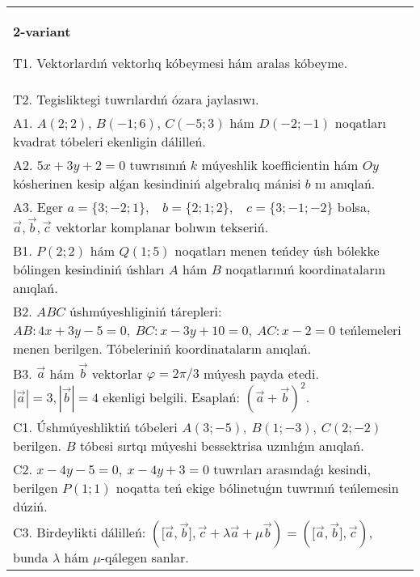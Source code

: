 \documentclass{article}
\begin{document}
\begin{tabular}{m{17cm}}
\textbf{2-variant}
\newline

T1. 
Vektorlardıń vektorlıq kóbeymesi hám aralas kóbeyme.
 \\
T2. 
Tegisliktegi tuwrılardıń ózara jaylasıwı.
 \\
A1. 
$A(2;2)$, $B(-1;6)$, $C(-5;3)$ hám $D(-2;-1)$
noqatları kvadrat tóbeleri ekenligin dálilleń.
 \\
A2. 
$5x+3y+2=0$ tuwrısınıń $k$ múyeshlik
koefficientin hám $Oy$ kósherinen kesip alǵan kesindiniń algebralıq
mánisi $b$ nı anıqlań.
 \\
A3. 
Eger \(a = \{ 3; - 2;1\},\ \ \ \ b = \{ 2;1;2\},\ \ \ \ c = \{ 3; - 1; - 2\}\) bolsa, $\overrightarrow{a}, \overrightarrow{b}, \overrightarrow{c}$ vektorlar komplanar bolıwın tekseriń.
 \\
B1. 
\(P(2;2)\) hám \(Q(1;5)\) noqatları menen teńdey úsh
bólekke bólingen kesindiniń úshları $A$ hám $B$ noqatlarınıń
koordinataların anıqlań.
 \\
B2. 
$ABC$ úshmúyeshliginiń tárepleri: 
\(AB:4x+3y-5=0,\ BC:x-3y+10=0,\ AC:x-2=0
\) teńlemeleri menen berilgen. Tóbeleriniń koordinataların anıqlań.
 \\
B3. 
$\vec{a}$ hám $\vec{b}$ vektorlar $\varphi = 2\pi/3$ múyesh payda etedi. $|\vec{a}| = 3,|\vec{b}| = 4$ ekenligi belgili. Esaplań: 
$(\vec{a} + \vec{b}) ^{2}$.
 \\
C1. 
Úshmúyeshliktiń tóbeleri
\(A(3; - 5),\ B(1; - 3),\ C(2; - 2)\) berilgen. $B$ tóbesi sırtqı
múyeshi bessektrisa uzınlıǵın anıqlań.
 \\
C2. 
\(x - 4y - 5 = 0,\ x - 4y + 3 = 0\) tuwrıları
arasındaǵı kesindi, berilgen \(P(1;1)\) noqatta teń ekige bólinetuǵın
tuwrınıń teńlemesin dúziń.
 \\
C3. 
Birdeylikti dálilleń: \((\lbrack\vec{a},\vec{b}\rbrack,\vec{c} + \lambda\vec{a} + \mu\vec{b}) = (\lbrack\vec{a},\vec{b}\rbrack,\vec{c})\), bunda \(\lambda\) hám \(\mu\)-qálegen sanlar.
 \\

\end{tabular}
\vspace{1cm}
\end{document}
